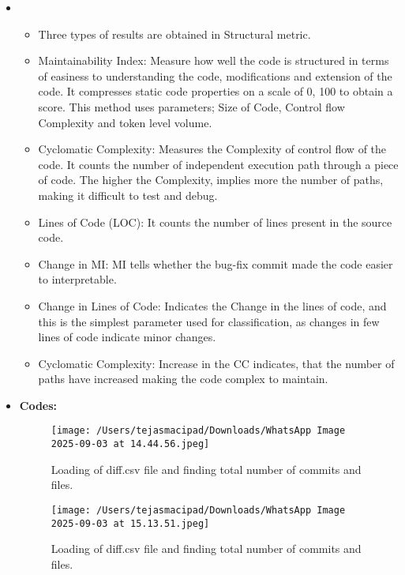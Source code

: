 \documentclass[12pt, a4paper]{report}
\begin{document}
\begin{itemize}
    \item \begin{itemize}
        \item Three types of results are obtained in Structural metric.
        \item {Maintainability Index: } Measure how well the code is structured in terms of easiness to understanding the code, modifications and extension of the code. It compresses static code properties on a scale of 0, 100 to obtain a score. This method uses parameters; Size of Code, Control flow Complexity and token level volume.
        \item {Cyclomatic Complexity: } Measures the Complexity of control flow of the code. It counts the number of independent execution path through a piece of code. The higher the Complexity, implies more the number of paths, making it difficult to test and debug.
        \item {Lines of Code (LOC): } It counts the number of lines present in the source code.
        \item {Change in MI: } MI tells whether the bug-fix commit made the code easier to interpretable.
        \item {Change in Lines of Code: } Indicates the Change in the lines of code, and this is the simplest parameter used for classification, as changes in few lines of code indicate minor changes.
        \item {Cyclomatic Complexity: } Increase in the CC indicates, that the number of paths have increased making the code complex to maintain.
    \end{itemize}

    \item \textbf{Codes:}

        \begin{figure}[!h] 
            \centering
            \texttt{[image: /Users/tejasmacipad/Downloads/WhatsApp Image 2025-09-03 at 14.44.56.jpeg]}
            \caption{Loading of diff.csv file and finding total number of commits and files.}
            \label{fig:diff-example-8}
        \end{figure}

        \begin{figure}[!h]
            \centering
            \texttt{[image: /Users/tejasmacipad/Downloads/WhatsApp Image 2025-09-03 at 15.13.51.jpeg]}
            \caption{Loading of diff.csv file and finding total number of commits and files.}
            \label{fig:diff-example-9}
        \end{figure}


\end{itemize}
\end{document}
